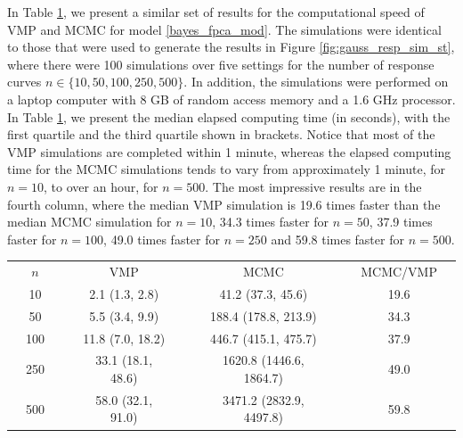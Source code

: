 \documentclass[12pt]{article}
\theoremstyle{plain}
\theoremstyle{definition}
\theoremstyle{remark}
\begin{document}
In Table \ref{tab:speed_comp}, we present a similar set of results for the computational speed of VMP and MCMC
for model \eqref{bayes_fpca_mod}. The simulations were identical to those that were used to generate the
results in Figure \ref{fig:gauss_resp_sim_st}, where there were 100 simulations over five settings for the number
of response curves $n \in \{10, 50, 100, 250, 500\}$. In addition, the simulations were performed on a laptop computer
with 8 GB of random access memory and a 1.6 GHz processor. In Table \ref{tab:speed_comp},
we present the median elapsed computing time (in seconds),
with the first quartile and the third quartile shown in brackets.
Notice that most of the VMP simulations are completed within 1 minute, whereas the elapsed computing time
for the MCMC simulations tends to vary from approximately 1 minute, for $n = 10$, to over an hour, for $n = 500$.
The most impressive results are in the fourth column, where the median VMP simulation is 19.6 times faster
than the median MCMC simulation for $n = 10$, 34.3 times faster for $n = 50$, 37.9 times faster for $n = 100$,
49.0 times faster for $n = 250$ and 59.8 times faster for $n = 500$.

\begin{table}
\begin{center}
\begin{tcolorbox}[size=tight,on line,left=0mm,right=0mm,width=0.9\textwidth,bottom=0mm,top=1mm,arc=0mm,outer arc=0pt, box align=center,boxrule=1.5pt]
\captionsetup{width=0.9\textwidth}
\begin{tabularx}{\textwidth}{X c X | X c X | X c X | X c X}
  \rowcolor[gray]{.8}
  & $n$ & & & VMP & & & MCMC & & & MCMC/VMP & \\
  \rowcolor{white!50}
  & 10 & & & 2.1 (1.3, 2.8) & & & 41.2 (37.3, 45.6) & & & 19.6 & \\
  \rowcolor{white!50}
  & 50 & & & 5.5 (3.4, 9.9) & & & 188.4 (178.8, 213.9) & & & 34.3 & \\
  \rowcolor{white!50}
  & 100 & & & 11.8 (7.0, 18.2) & & & 446.7 (415.1, 475.7) & & & 37.9 & \\
  \rowcolor{white!50}
  & 250 & & & 33.1 (18.1, 48.6) & & & 1620.8 (1446.6, 1864.7) & & & 49.0 & \\
  \rowcolor{white!50}
  & 500 & & & 58.0 (32.1, 91.0) & & & 3471.2 (2832.9, 4497.8) & & & 59.8 & \\
\end{tabularx}
\label{tab:speed_comp}
\end{tcolorbox}
\end{center}
\end{table}
\end{document}
